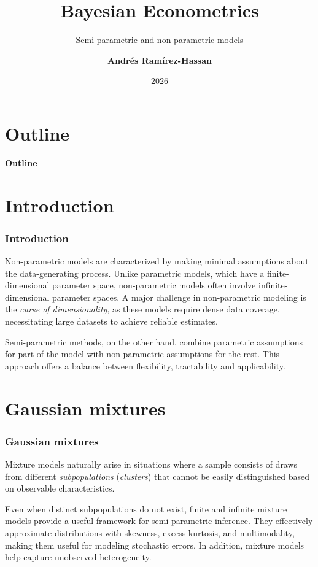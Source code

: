 \documentclass[12pt, compress]{beamer}
\title{Bayesian Econometrics}
\subtitle{Semi-parametric and non-parametric models}
\date{2026}
\author[Andr\'e Ram\'irez H.]{\textbf{Andr\'es Ram\'irez-Hassan}}
\institute[EAFIT]{\small{Universidad EAFIT\\School of Finance, Economics and Government}}
\begin{document}
	
	\maketitle
	
	
	
	
	\section*{Outline}
	\begin{frame}
		\textbf{\Large{Outline}}
		\tableofcontents
	\end{frame}
	
\section{Introduction}
	
\begin{frame}
	\frametitle{Introduction}
Non-parametric models are characterized by making minimal assumptions about the data-generating process. Unlike parametric models, which have a finite-dimensional parameter space, non-parametric models often involve infinite-dimensional parameter spaces. A major challenge in non-parametric modeling is the \textit{curse of dimensionality}, as these models require dense data coverage, necessitating large datasets to achieve reliable estimates.

Semi-parametric methods, on the other hand, combine parametric assumptions for part of the model with non-parametric assumptions for the rest. This approach offers a balance between flexibility, tractability and applicability.
\end{frame}

\section{Gaussian mixtures}
\begin{frame}
	\frametitle{Gaussian mixtures}
Mixture models naturally arise in situations where a sample consists of draws from different \textit{subpopulations} (\textit{clusters}) that cannot be easily distinguished based on observable characteristics.  

Even when distinct subpopulations do not exist, finite and infinite mixture models provide a useful framework for semi-parametric inference. They effectively approximate distributions with skewness, excess kurtosis, and multimodality, making them useful for modeling stochastic errors. In addition, mixture models help capture unobserved heterogeneity. 
\end{frame}
\end{document}

